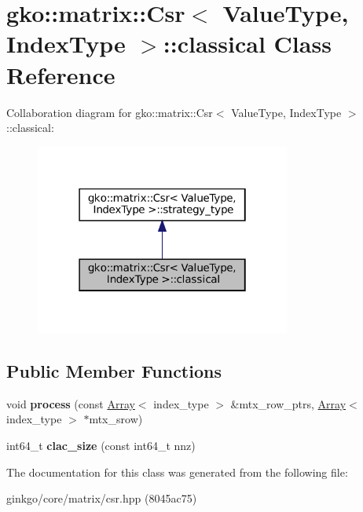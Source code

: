 \hypertarget{classgko_1_1matrix_1_1Csr_1_1classical}{}\section{gko\+:\+:matrix\+:\+:Csr$<$ Value\+Type, Index\+Type $>$\+:\+:classical Class Reference}
\label{classgko_1_1matrix_1_1Csr_1_1classical}


Collaboration diagram for gko\+:\+:matrix\+:\+:Csr$<$ Value\+Type, Index\+Type $>$\+:\+:classical\+:
\nopagebreak
\begin{figure}[H]
\begin{center}
\leavevmode
\includegraphics[width=238pt]{classgko_1_1matrix_1_1Csr_1_1classical__coll__graph}
\end{center}
\end{figure}
\subsection*{Public Member Functions}
\begin{DoxyCompactItemize}
\item 
\mbox{\label{classgko_1_1matrix_1_1Csr_1_1classical_a3d2766e56763c491948818e0f3da4356}} 
void {\bfseries process} (const \hyperlink{classgko_1_1Array}{Array}$<$ index\+\_\+type $>$ \&mtx\+\_\+row\+\_\+ptrs, \hyperlink{classgko_1_1Array}{Array}$<$ index\+\_\+type $>$ $\ast$mtx\+\_\+srow)
\item 
\mbox{\label{classgko_1_1matrix_1_1Csr_1_1classical_a790b475b079d3d97de776e968f459f41}} 
int64\+\_\+t {\bfseries clac\+\_\+size} (const int64\+\_\+t nnz)
\end{DoxyCompactItemize}


The documentation for this class was generated from the following file\+:\begin{DoxyCompactItemize}
\item 
ginkgo/core/matrix/csr.\+hpp (8045ac75)\end{DoxyCompactItemize}

